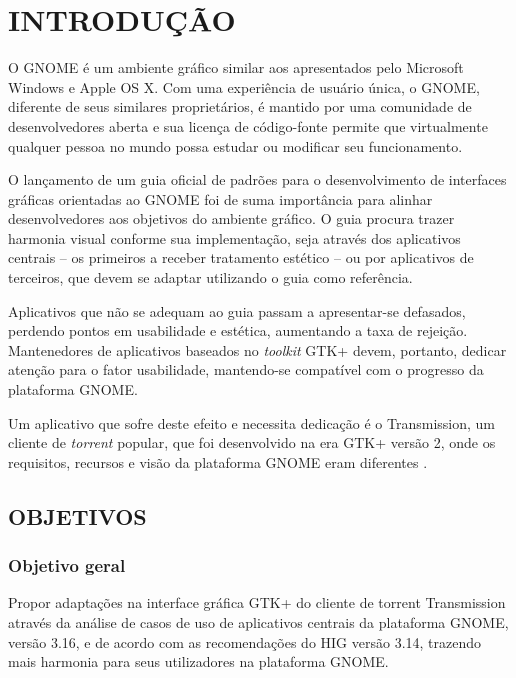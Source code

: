 \documentclass[
    12pt,               %
    openright,          %
    oneside,            %
    a4paper,            %
    chapter=TITLE,      %
    section=TITLE,      %
    english,
    brazil              %
]{abntex2}
\begin{document}
\textual

\chapter{INTRODUÇÃO}

O GNOME é um ambiente gráfico similar aos apresentados pelo Microsoft Windows e
Apple OS X. Com uma experiência de usuário única, o GNOME, diferente de seus
similares proprietários, é mantido por uma comunidade de desenvolvedores aberta
e sua licença de código-fonte permite que virtualmente qualquer pessoa no mundo
possa estudar ou modificar seu funcionamento.

O lançamento de um guia oficial de padrões para o desenvolvimento de interfaces
gráficas orientadas ao GNOME foi de suma importância para alinhar
desenvolvedores aos objetivos do ambiente gráfico. O guia procura trazer
harmonia visual conforme sua implementação, seja através dos aplicativos
centrais -- os primeiros a receber tratamento estético -- ou por aplicativos de
terceiros, que devem se adaptar utilizando o guia como referência.

Aplicativos que não se adequam ao guia passam a apresentar-se defasados,
perdendo pontos em usabilidade e estética, aumentando a taxa de rejeição.
Mantenedores de aplicativos baseados no \textit{toolkit} GTK+ devem, portanto,
dedicar atenção para o fator usabilidade, mantendo-se compatível com o progresso
da plataforma GNOME.

Um aplicativo que sofre deste efeito e necessita dedicação é o Transmission, um
cliente de \textit{torrent} popular, que foi desenvolvido na era GTK+ versão 2,
onde os requisitos, recursos e visão da plataforma GNOME eram diferentes
\cite{gnome221hig}.

\section{OBJETIVOS}

\subsection{Objetivo geral}

Propor adaptações na interface gráfica GTK+ do cliente de torrent Transmission
através da análise de casos de uso de aplicativos centrais da plataforma GNOME,
versão 3.16, e de acordo com as recomendações do HIG versão 3.14, trazendo mais
harmonia para seus utilizadores na plataforma GNOME.
\end{document}

